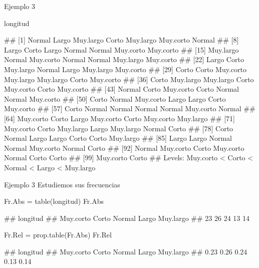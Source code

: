 \documentclass[
  ignorenonframetext,
  aspectratio=169]{beamer}
\newenvironment{Shaded}{\begin{snugshade}}{\end{snugshade}}
\newcommand{\FunctionTok}[1]{\textcolor[rgb]{0.00,0.00,0.00}{#1}}
\newcommand{\NormalTok}[1]{#1}
\newcommand{\OtherTok}[1]{\textcolor[rgb]{0.56,0.35,0.01}{#1}}
\let\oldverbatim\verbatim
\let\endoldverbatim\endverbatim
\renewenvironment{verbatim}{\tiny\oldverbatim}{\endoldverbatim}
\begin{document}
\begin{frame}[fragile]{Ejemplo 3}
\protect\hypertarget{ejemplo-3-1}{}
\begin{Shaded}
\begin{Highlighting}[]
\NormalTok{longitud}
\end{Highlighting}
\end{Shaded}

\begin{verbatim}
##   [1] Normal    Largo     Muy.largo Corto     Muy.largo Muy.corto Normal   
##   [8] Largo     Corto     Largo     Normal    Normal    Muy.corto Muy.corto
##  [15] Muy.largo Normal    Muy.corto Normal    Normal    Muy.largo Muy.corto
##  [22] Largo     Corto     Muy.largo Normal    Largo     Muy.largo Muy.corto
##  [29] Corto     Corto     Muy.corto Muy.largo Muy.largo Corto     Muy.corto
##  [36] Corto     Muy.largo Muy.largo Corto     Muy.corto Corto     Muy.corto
##  [43] Normal    Corto     Muy.corto Corto     Normal    Normal    Muy.corto
##  [50] Corto     Normal    Muy.corto Largo     Largo     Corto     Muy.corto
##  [57] Corto     Normal    Normal    Normal    Normal    Muy.corto Normal   
##  [64] Muy.corto Corto     Largo     Muy.corto Corto     Muy.corto Muy.largo
##  [71] Muy.corto Corto     Muy.largo Largo     Muy.largo Normal    Corto    
##  [78] Corto     Normal    Largo     Largo     Corto     Corto     Muy.largo
##  [85] Largo     Largo     Normal    Normal    Muy.corto Normal    Corto    
##  [92] Normal    Muy.corto Corto     Muy.corto Normal    Corto     Corto    
##  [99] Muy.corto Corto    
## Levels: Muy.corto < Corto < Normal < Largo < Muy.largo
\end{verbatim}
\end{frame}

\begin{frame}[fragile]{Ejemplo 3}
\protect\hypertarget{ejemplo-3-2}{}
Estudiemos sus frecuencias

\begin{Shaded}
\begin{Highlighting}[]
\NormalTok{Fr.Abs }\OtherTok{=} \FunctionTok{table}\NormalTok{(longitud)}
\NormalTok{Fr.Abs}
\end{Highlighting}
\end{Shaded}

\begin{verbatim}
## longitud
## Muy.corto     Corto    Normal     Largo Muy.largo 
##        23        26        24        13        14
\end{verbatim}

\begin{Shaded}
\begin{Highlighting}[]
\NormalTok{Fr.Rel }\OtherTok{=} \FunctionTok{prop.table}\NormalTok{(Fr.Abs)}
\NormalTok{Fr.Rel}
\end{Highlighting}
\end{Shaded}

\begin{verbatim}
## longitud
## Muy.corto     Corto    Normal     Largo Muy.largo 
##      0.23      0.26      0.24      0.13      0.14
\end{verbatim}
\end{frame}
\end{document}
